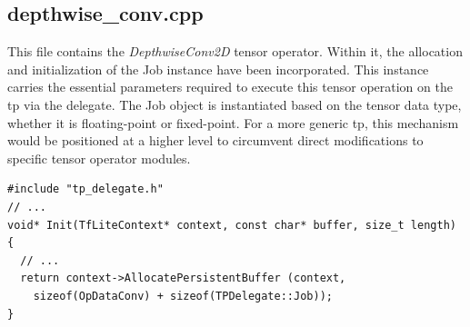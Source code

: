 \subsection*{depthwise\_conv.cpp}

This file contains the \textit{DepthwiseConv2D} tensor operator. Within it, the allocation and initialization of the Job instance have been incorporated. This instance carries the essential parameters required to execute this tensor operation on the \gls{tp} via the delegate. The Job object is instantiated based on the tensor data type, whether it is floating-point or fixed-point. For a more generic \gls{tp}, this mechanism would be positioned at a higher level to circumvent direct modifications to specific tensor operator modules.

\begin{verbatim}
#include "tp_delegate.h"
// ...
void* Init(TfLiteContext* context, const char* buffer, size_t length)
{
  // ...
  return context->AllocatePersistentBuffer (context,
    sizeof(OpDataConv) + sizeof(TPDelegate::Job));
}
\end{verbatim}

